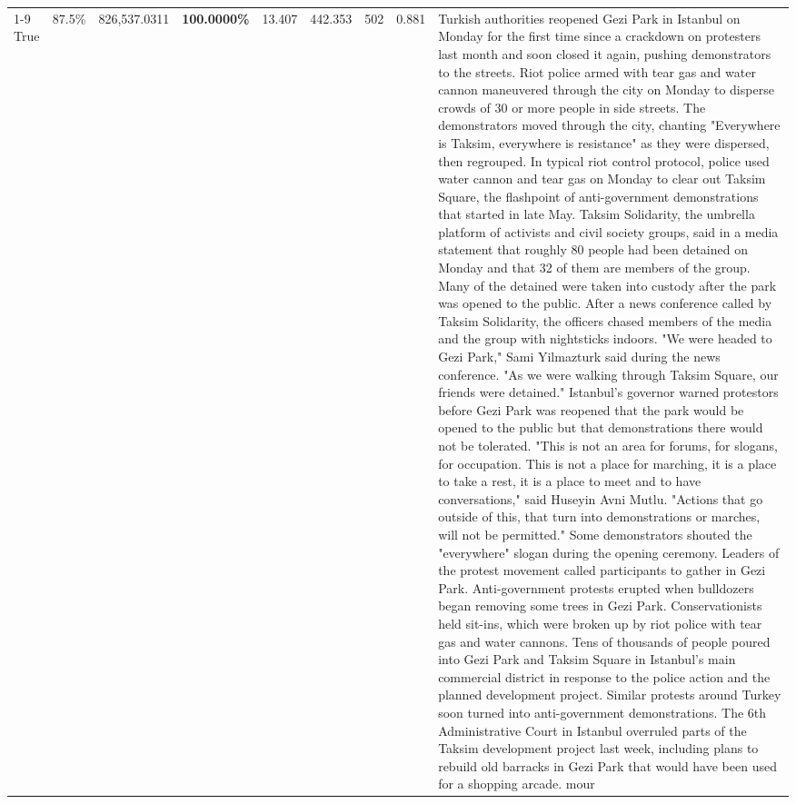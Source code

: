 \begin{table}[H]
\begin{tabular}{lllrlllll}
\cline{1-9}
True & 87.5\% & 826,537.0311 & \bfseries \color{red} 100.0000\% & 13.407 & 442.353 & 502 & 0.881 & Turkish authorities reopened Gezi Park in Istanbul on Monday for the first time since a crackdown on protesters last month and soon closed it again, pushing demonstrators to the streets. Riot police armed with tear gas and water cannon maneuvered through the city on Monday to disperse crowds of 30 or more people in side streets. The demonstrators moved through the city, chanting "Everywhere is Taksim, everywhere is resistance" as they were dispersed, then regrouped. In typical riot control protocol, police used water cannon and tear gas on Monday to clear out Taksim Square, the flashpoint of anti-government demonstrations that started in late May. Taksim Solidarity, the umbrella platform of activists and civil society groups, said in a media statement that roughly 80 people had been detained on Monday and that 32 of them are members of the group. Many of the detained were taken into custody after the park was opened to the public. After a news conference called by Taksim Solidarity, the officers chased members of the media and the group with nightsticks indoors. "We were headed to Gezi Park," Sami Yilmazturk said during the news conference. "As we were walking through Taksim Square, our friends were detained." Istanbul's governor warned protestors before Gezi Park was reopened that the park would be opened to the public but that demonstrations there would not be tolerated. "This is not an area for forums, for slogans, for occupation. This is not a place for marching, it is a place to take a rest, it is a place to meet and to have conversations," said Huseyin Avni Mutlu. "Actions that go outside of this, that turn into demonstrations or marches, will not be permitted." Some demonstrators shouted the "everywhere" slogan during the opening ceremony. Leaders of the protest movement called participants to gather in Gezi Park. Anti-government protests erupted when bulldozers began removing some trees in Gezi Park. Conservationists held sit-ins, which were broken up by riot police with tear gas and water cannons. Tens of thousands of people poured into Gezi Park and Taksim Square in Istanbul's main commercial district in response to the police action and the planned development project. Similar protests around Turkey soon turned into anti-government demonstrations. The 6th Administrative Court in Istanbul overruled parts of the Taksim development project last week, including plans to rebuild old barracks in Gezi Park that would have been used for a shopping arcade. mour \\

\end{tabular}
\end{table}
